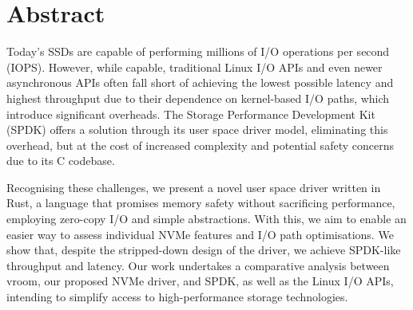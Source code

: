 \chapter{Abstract}
Today's SSDs are capable of performing millions of I/O operations per second (IOPS). However, while capable, traditional Linux I/O APIs and even newer asynchronous APIs often fall short of achieving the lowest possible latency and highest throughput due to their dependence on kernel-based I/O paths, which introduce significant overheads. The Storage Performance Development Kit (SPDK) offers a solution through its user space driver model, eliminating this overhead, but at the cost of increased complexity and potential safety concerns due to its C codebase.

Recognising these challenges, we present a novel user space driver written in Rust, a language that promises memory safety without sacrificing performance, employing zero-copy I/O and simple abstractions. With this, we aim to enable an easier way to assess individual NVMe features and I/O path optimisations. We show that, despite the stripped-down design of the driver, we achieve SPDK-like throughput and latency. Our work undertakes a comparative analysis between vroom, our proposed NVMe driver, and SPDK, as well as the Linux I/O APIs, intending to simplify access to high-performance storage technologies.
